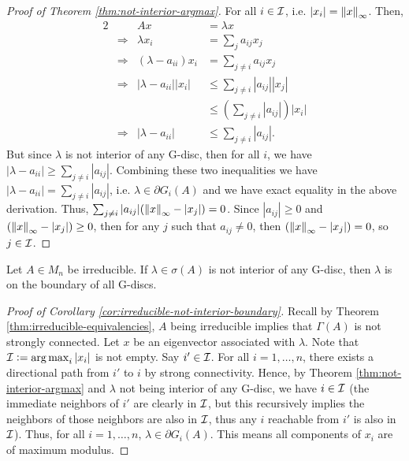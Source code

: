 \begin{proof}[Proof of Theorem \ref{thm:not-interior-argmax}]
For all $i \in \mathcal{I}$, i.e. $|x_i| = \left\lVert x\right\rVert_\infty$. Then,
\begin{alignat*}{2}
    && Ax &= \lambda x \\
    & \Longrightarrow & \lambda x_i &= \sum_j a_{ij}x_j \\
    & \Longrightarrow & (\lambda-a_{ii})x_i &= \sum_{j \not=i} a_{ij}x_j \\
    & \Longrightarrow & |\lambda-a_{ii}| |x_i| &\le \sum_{j\not=i}|a_{ij}||x_j| \\
    &&&\le \left(\sum_{j \not=i} |a_{ij}|\right)|x_i| \\
    & \Longrightarrow & |\lambda - a_{ii}| &\le \sum_{j \not=i}|a_{ij}|.
\end{alignat*}
But since $\lambda$ is not interior of any G-disc, then for all $i$, we have $|\lambda-a_{ii}| \ge \sum_{j\not=i}|a_{ij}|$. Combining these two inequalities we have $|\lambda-a_{ii}| = \sum_{j\not=i}|a_{ij}|$, i.e. $\lambda \in \partial G_i(A)$ and we have exact equality in the above derivation. Thus, $\sum_{j\not=i}|a_{ij}|(\left\lVert x\right\rVert_\infty - |x_j|) = 0$. Since $|a_{ij}| \ge 0$ and $(\left\lVert x\right\rVert_\infty - |x_j|) \ge 0$, then for any $j$ such that $a_{ij} \not= 0$, then $(\left\lVert x\right\rVert_\infty - |x_j|) = 0$, so $j \in \mathcal{I}$.
\end{proof}

\begin{corollary}
\label{cor:irreducible-not-interior-boundary}
Let $A \in M_n$ be irreducible. If $\lambda \in \sigma(A)$ is not interior of any G-disc, then $\lambda$ is on the boundary of all G-discs.
\end{corollary}
\begin{proof}[Proof of Corollary \ref{cor:irreducible-not-interior-boundary}]
Recall by Theorem \ref{thm:irreducible-equivalencies}, $A$ being irreducible implies that $\Gamma(A)$ is not strongly connected. Let $x$ be an eigenvector associated with $\lambda$. Note that $\mathcal{I} \vcentcolon= \operatorname*{arg\,max}_i |x_i|$ is not empty. Say $i' \in \mathcal{I}$. For all $i = 1,\dots,n$, there exists a directional path from $i'$ to $i$ by strong connectivity. Hence, by Theorem \ref{thm:not-interior-argmax} and $\lambda$ not being interior of any G-disc, we have $i \in \mathcal{I}$ (the immediate neighbors of $i'$ are clearly in $\mathcal{I}$, but this recursively implies the neighbors of those neighbors are also in $\mathcal{I}$, thus any $i$ reachable from $i'$ is also in $\mathcal{I}$). Thus, for all $i = 1, \dots,n$, $\lambda \in \partial G_i(A)$. This means all components of $x_i$ are of maximum modulus.
\end{proof}

